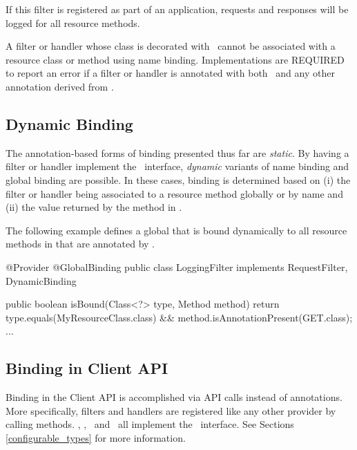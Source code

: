 If this filter is registered as part of an application, requests and responses will be logged for all resource methods. 

A filter or handler whose class is decorated with \GlobalBinding\ cannot be associated with a resource class or method using name binding. Implementations are REQUIRED to report an error if a filter or handler is annotated with both \GlobalBinding\ and any other annotation derived from \NameBinding.

\subsection{Dynamic Binding}

The annotation-based forms of binding presented thus far are {\em static}.  By having a filter or handler implement the \DynamicBinding\ interface, {\em dynamic} variants of name binding and global binding are possible. In these cases, binding is determined based on (i) the filter or handler being associated to a resource method globally or by name and (ii) the value returned by the  method in \DynamicBinding. 

The following example defines a global  that is bound dynamically to all resource methods in  that are annotated by .

\begin{listing}{1}
@Provider
@GlobalBinding
public class LoggingFilter implements RequestFilter, DynamicBinding {

    public boolean isBound(Class<?> type, Method method) {
        return type.equals(MyResourceClass.class) 
            && method.isAnnotationPresent(GET.class);    
    }
    ...
}
\end{listing}



\subsection{Binding in Client API}
\label{binding_in_client_api}

Binding in the Client API is accomplished via API calls instead of annotations. More specifically, filters and handlers are registered like any other provider by calling  methods. \Client, \Invocation, \InvocationBuilder\ and \Target\ all implement the \Configurable\ interface. See Sections \ref{configurable_types} for more information.

